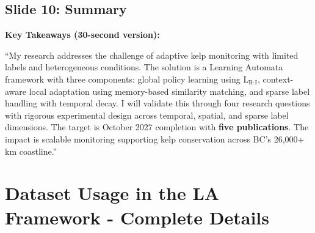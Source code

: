\documentclass[11pt]{article}
\begin{document}
\vspace{0.5em}

\subsection{Slide 10: Summary}

\textbf{Key Takeaways (30-second version):}

``My research addresses the challenge of adaptive kelp monitoring with limited labels and heterogeneous conditions. The solution is a Learning Automata framework with three components: global policy learning using L$_{\text{R-I}}$, context-aware local adaptation using memory-based similarity matching, and sparse label handling with temporal decay. I will validate this through four research questions with rigorous experimental design across temporal, spatial, and sparse label dimensions. The target is October 2027 completion with \textbf{five publications}. The impact is scalable monitoring supporting kelp conservation across BC's 26,000+ km coastline.''

\section{Dataset Usage in the LA Framework - Complete Details}
\end{document}
